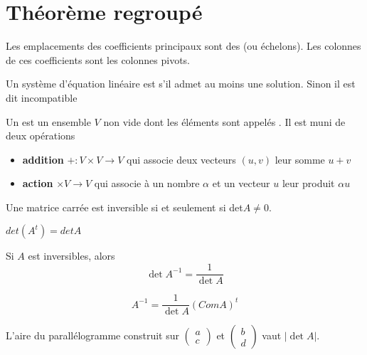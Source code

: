 \chapter{Théorème regroupé}
    
    \begin{definition}
        Les emplacements des coefficients principaux sont des  (ou échelons). Les colonnes de ces coefficients sont les colonnes pivots.
    \end{definition}
    \begin{definition}
        Un système d'équation linéaire est  s'il admet au moins une solution. Sinon il est dit incompatible
    \end{definition}
        \begin{definition}
        Un  est un ensemble $V$ non vide dont les éléments sont appelés . Il est muni de deux opérations
        \begin{itemize}
            \item \textbf{addition} $+ : V \times V \to V$ qui associe deux vecteurs $(u, v)$ leur somme $u + v$
            \item \textbf{action} \R$ \times V \to V$ qui associe à un nombre $\alpha$ et un vecteur $u$ leur produit $\alpha u$
        \end{itemize}
    \end{definition}
     \begin{theoreme}
        Une matrice carrée est inversible si et seulement si det$A \neq 0$.
    \end{theoreme}
        \begin{theoreme}
        $det(A^t) = detA$
    \end{theoreme}
        \begin{corollaire}
       Si $A$ est inversibles, alors
       \[\det A^{-1} = \frac{1}{\det A}\]
    \end{corollaire} 
    \begin{definition}
    \begin{equation*}
        A^{-1} = \frac{1}{\det A}(ComA)^t
    \end{equation*}
\end{definition}
\begin{theorem}
    L'aire du parallélogramme construit sur $\begin{pmatrix} a \\ c \end{pmatrix}$ et $\begin{pmatrix} b \\ d \end{pmatrix}$ vaut $|\det A|$.
\end{theorem}
